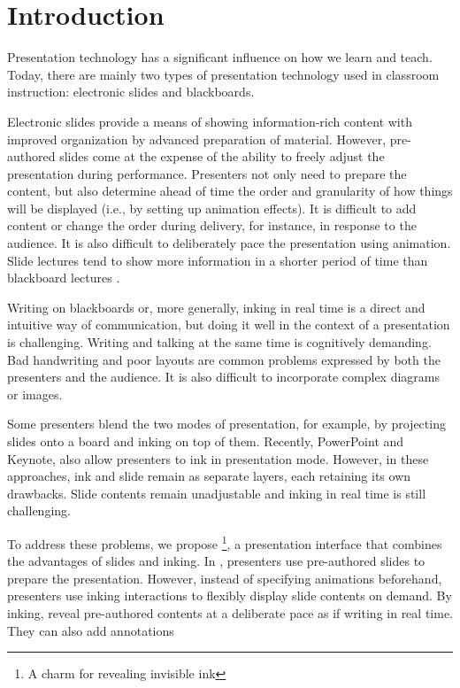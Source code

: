 \section{Introduction}

Presentation technology has a significant influence on how we learn and teach. 
Today, there are mainly two types of presentation technology used in classroom instruction: electronic slides and blackboards. 

Electronic slides provide a means of showing information-rich content with improved organization by advanced preparation of material. However, pre-authored slides come at the expense of the ability to freely adjust the presentation during performance. Presenters not only need to prepare the content, but also determine ahead of time the order and granularity of how things will be displayed (i.e., by setting up animation effects). It is difficult to add content or change the order during delivery, for instance, in response to the audience. It is also difficult to deliberately pace the presentation using animation. Slide lectures tend to show more information in a shorter period of time than blackboard lectures \cite{lanir2008observing}.

Writing on blackboards or, more generally, inking in real time is a direct and intuitive way of communication, but doing it well in the context of a presentation is challenging. Writing and talking at the same time is cognitively demanding. Bad handwriting and poor layouts are common problems expressed by both the presenters and the audience. It is also difficult to incorporate complex diagrams or images.

Some presenters blend the two modes of presentation, for example, by projecting slides onto a board and inking on top of them. Recently, PowerPoint and Keynote, also allow presenters to ink in presentation mode. However, in these approaches, ink and slide remain as separate layers, each retaining its own drawbacks. Slide contents remain unadjustable and inking in real time is still challenging.  

To address these problems, we propose \interface \footnote{A charm for revealing invisible ink\cite{rowling1997harry}}, a presentation interface that combines the advantages of slides and inking.
%
In \interface, presenters use pre-authored slides to prepare the presentation. However, instead of specifying animations beforehand, presenters use inking interactions to flexibly display slide contents on demand. By inking, reveal pre-authored contents at a deliberate pace as if writing in real time. They can also add annotations  

